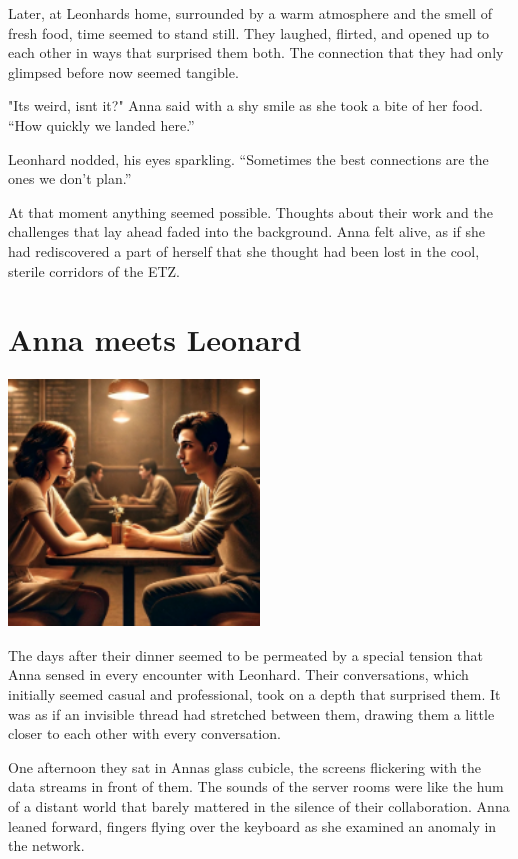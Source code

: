 \documentclass[
]{article}
\begin{document}
Later, at Leonhard\textquotesingle s home, surrounded by a warm
atmosphere and the smell of fresh food, time seemed to stand still. They
laughed, flirted, and opened up to each other in ways that surprised
them both. The connection that they had only glimpsed before now seemed
tangible.

"It\textquotesingle s weird, isn\textquotesingle t it?" Anna said with a
shy smile as she took a bite of her food. ``How quickly we landed
here.''

Leonhard nodded, his eyes sparkling. ``Sometimes the best connections
are the ones we don't plan.''

At that moment anything seemed possible. Thoughts about their work and
the challenges that lay ahead faded into the background. Anna felt
alive, as if she had rediscovered a part of herself that she thought had
been lost in the cool, sterile corridors of the ETZ.

\section{Anna meets Leonard}\label{anna-meets-leonard}

\includegraphics[width=2.625in,height=2.59375in]{media/image0003.png}

The days after their dinner seemed to be permeated by a special tension
that Anna sensed in every encounter with Leonhard. Their conversations,
which initially seemed casual and professional, took on a depth that
surprised them. It was as if an invisible thread had stretched between
them, drawing them a little closer to each other with every
conversation.

One afternoon they sat in Anna\textquotesingle s glass cubicle, the
screens flickering with the data streams in front of them. The sounds of
the server rooms were like the hum of a distant world that barely
mattered in the silence of their collaboration. Anna leaned forward,
fingers flying over the keyboard as she examined an anomaly in the
network.
\end{document}
